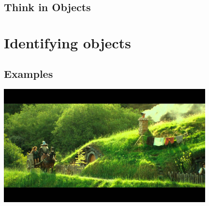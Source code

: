 \subsection{Think in Objects}

\begin{frame}{}
	\begin{center}
		
		
		
		

		
	\end{center}
\end{frame}

\section{Identifying objects}
\subsection{Examples}

\begin{frame}{}
	\begin{center}
		\includegraphics[width=11cm]{res/lotr-shire.jpg}
	\end{center}
\end{frame}

